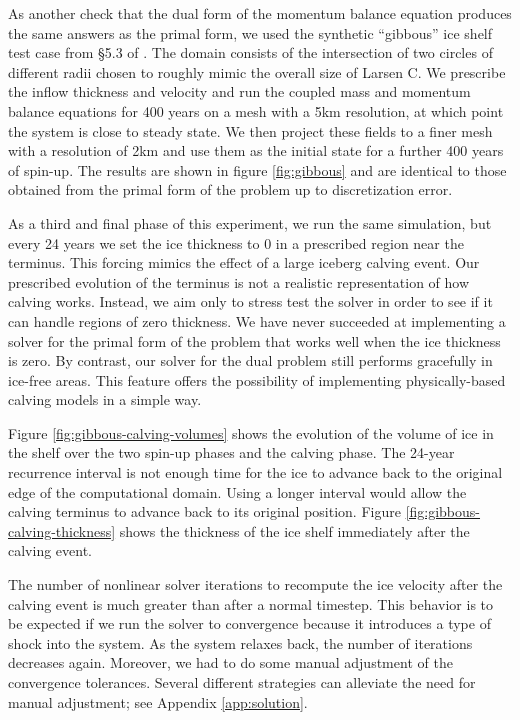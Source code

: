 \documentclass[review,oneside]{igs}
\begin{document}
As another check that the dual form of the momentum balance equation produces the same answers as the primal form, we used the synthetic ``gibbous'' ice shelf test case from \S5.3 of \citet{shapero2021icepack}.
The domain consists of the intersection of two circles of different radii chosen to roughly mimic the overall size of Larsen C.
We prescribe the inflow thickness and velocity and run the coupled mass and momentum balance equations for 400 years on a mesh with a 5km resolution, at which point the system is close to steady state.
We then project these fields to a finer mesh with a resolution of 2km and use them as the initial state for a further 400 years of spin-up.
The results are shown in figure \ref{fig:gibbous} and are identical to those obtained from the primal form of the problem up to discretization error.

As a third and final phase of this experiment, we run the same simulation, but every 24 years we set the ice thickness to 0 in a prescribed region near the terminus.
This forcing mimics the effect of a large iceberg calving event.
Our prescribed evolution of the terminus is not a realistic representation of how calving works.
Instead, we aim only to stress test the solver in order to see if it can handle regions of zero thickness.
We have never succeeded at implementing a solver for the primal form of the problem that works well when the ice thickness is zero.
By contrast, our solver for the dual problem still performs gracefully in ice-free areas.
This feature offers the possibility of implementing physically-based calving models in a simple way.

Figure \ref{fig:gibbous-calving-volumes} shows the evolution of the volume of ice in the shelf over the two spin-up phases and the calving phase.
The 24-year recurrence interval is not enough time for the ice to advance back to the original edge of the computational domain.
Using a longer interval would allow the calving terminus to advance back to its original position.
Figure \ref{fig:gibbous-calving-thickness} shows the thickness of the ice shelf immediately after the calving event.

The number of nonlinear solver iterations to recompute the ice velocity after the calving event is much greater than after a normal timestep.
This behavior is to be expected if we run the solver to convergence because it introduces a type of shock into the system.
As the system relaxes back, the number of iterations decreases again.
Moreover, we had to do some manual adjustment of the convergence tolerances.
Several different strategies can alleviate the need for manual adjustment; see Appendix \ref{app:solution}.
\end{document}
